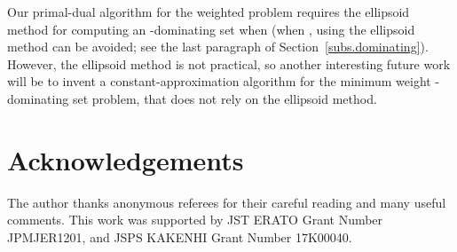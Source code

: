 \documentclass[11pt]{article}
\begin{document}
 
 Our primal-dual algorithm
 for the weighted problem
 requires the ellipsoid method
 for computing an -dominating set when  (when ,
 using the ellipsoid method can be avoided; see the last paragraph of Section~\ref{subs.dominating}).
 However, the ellipsoid method is not practical, so 
another interesting future work will be to invent a
 constant-approximation algorithm for the minimum weight -dominating
 set problem, that does not rely on the ellipsoid method.

\section*{Acknowledgements}
The author thanks anonymous referees for their careful reading and many useful comments.
This work was supported by JST ERATO Grant Number JPMJER1201, and
JSPS KAKENHI Grant Number 17K00040.
\end{document}
